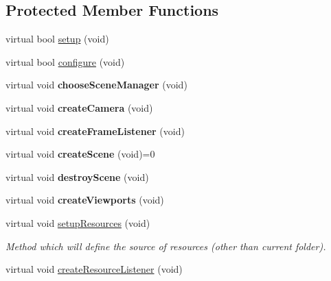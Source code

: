 \subsection*{Protected Member Functions}
\begin{DoxyCompactItemize}
\item 
virtual bool \hyperlink{class_example_application_aa3432ea3ead8830abe277fa7bb2fed50}{setup} (void)
\item 
virtual bool \hyperlink{class_example_application_a89afa78709beb837b1c8f0d6b81f9e30}{configure} (void)
\item 
\hypertarget{class_example_application_ae4e076ed0b6f3dc621d06ee0a216c924}{
virtual void {\bfseries chooseSceneManager} (void)}
\label{class_example_application_ae4e076ed0b6f3dc621d06ee0a216c924}

\item 
\hypertarget{class_example_application_a6e2ddbfb3a13350f437f8e6e75ce8b0a}{
virtual void {\bfseries createCamera} (void)}
\label{class_example_application_a6e2ddbfb3a13350f437f8e6e75ce8b0a}

\item 
\hypertarget{class_example_application_a87b90269fa2dcbcbc5ba947c0ce640f7}{
virtual void {\bfseries createFrameListener} (void)}
\label{class_example_application_a87b90269fa2dcbcbc5ba947c0ce640f7}

\item 
\hypertarget{class_example_application_a909894ea3c9e5a72bbcbee0a9f0a6b5b}{
virtual void {\bfseries createScene} (void)=0}
\label{class_example_application_a909894ea3c9e5a72bbcbee0a9f0a6b5b}

\item 
\hypertarget{class_example_application_abe637b51003ae6cfaf6eaf3b1adef04d}{
virtual void {\bfseries destroyScene} (void)}
\label{class_example_application_abe637b51003ae6cfaf6eaf3b1adef04d}

\item 
\hypertarget{class_example_application_af6db60976b4919acebe7c6672bbbe826}{
virtual void {\bfseries createViewports} (void)}
\label{class_example_application_af6db60976b4919acebe7c6672bbbe826}

\item 
\hypertarget{class_example_application_ac28835f9844520f0d096d102d27e0325}{
virtual void \hyperlink{class_example_application_ac28835f9844520f0d096d102d27e0325}{setupResources} (void)}
\label{class_example_application_ac28835f9844520f0d096d102d27e0325}

\begin{DoxyCompactList}\small\item\em Method which will define the source of resources (other than current folder). \item\end{DoxyCompactList}\item 
\hypertarget{class_example_application_a76e70aeb628407bcc63a575c286f937b}{
virtual void \hyperlink{class_example_application_a76e70aeb628407bcc63a575c286f937b}{createResourceListener} (void)}
\label{class_example_application_a76e70aeb628407bcc63a575c286f937b}


\end{DoxyCompactItemize}
